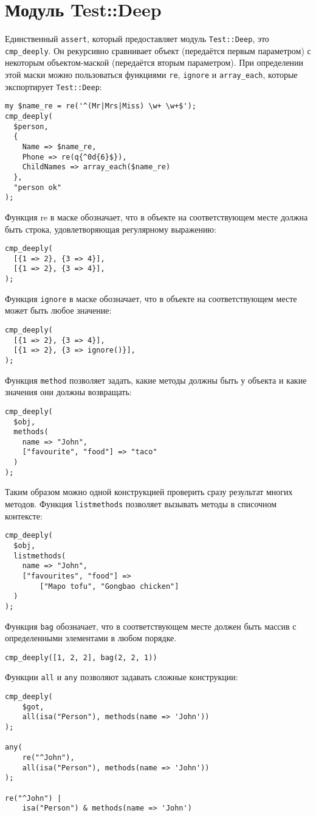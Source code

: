 \section{Модуль Test::Deep}
Единственный \verb|assert|, который предоставляет модуль \verb|Test::Deep|, это \verb|cmp_deeply|. Он рекурсивно сравнивает объект (передаётся первым параметром) с некоторым объектом-маской (передаётся вторым параметром). При определении этой маски можно пользоваться функциями \verb|re|, \verb|ignore| и \verb|array_each|, которые экспортирует \verb|Test::Deep|:
\begin{verbatim}
my $name_re = re('^(Mr|Mrs|Miss) \w+ \w+$');
cmp_deeply(
  $person,
  {
    Name => $name_re,
    Phone => re(q{^0d{6}$}),
    ChildNames => array_each($name_re)
  },
  "person ok"
);

\end{verbatim}
Функция re в маске обозначает, что в объекте на соответствующем месте должна быть строка, удовлетворяющая регулярному выражению:
\begin{verbatim}
cmp_deeply(
  [{1 => 2}, {3 => 4}],
  [{1 => 2}, {3 => 4}],
);
\end{verbatim}
Функция \verb|ignore| в маске обозначает, что в объекте на соответствующем месте может быть любое значение:
\begin{verbatim}
cmp_deeply(
  [{1 => 2}, {3 => 4}],
  [{1 => 2}, {3 => ignore()}],
);
\end{verbatim}
Функция \verb|method| позволяет задать, какие методы должны быть у объекта и какие значения они должны возвращать:
\begin{verbatim}
cmp_deeply(
  $obj,
  methods(
    name => "John",
    ["favourite", "food"] => "taco"
  )
);
\end{verbatim}
Таким образом можно одной конструкцией проверить сразу результат многих методов. Функция \verb|listmethods| позволяет вызывать методы в списочном контексте:
\begin{verbatim}
cmp_deeply(
  $obj,
  listmethods(
    name => "John",
    ["favourites", "food"] =>
        ["Mapo tofu", "Gongbao chicken"]
  )
);
\end{verbatim}
Функция \verb|bag| обозначает, что в соответствующем месте должен быть массив с определенными элементами в любом порядке.
\begin{verbatim}
cmp_deeply([1, 2, 2], bag(2, 2, 1))
\end{verbatim}
Функции \verb|all| и \verb|any| позволяют задавать сложные конструкции: %
\begin{verbatim}
cmp_deeply(
    $got,
    all(isa("Person"), methods(name => 'John'))
);

any(
    re("^John"),
    all(isa("Person"), methods(name => 'John'))
);

re("^John") |
    isa("Person") & methods(name => 'John')
\end{verbatim}


